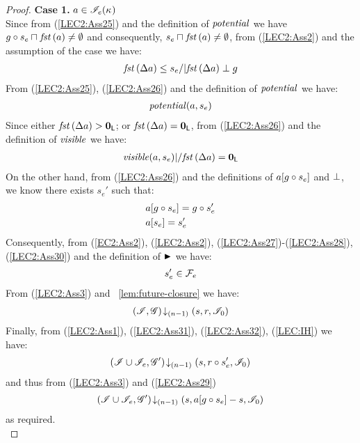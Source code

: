\begin{lemma}
\begin{proof}
\noindent\textbf{Case 1. }$a \in \mathscr{I}_e(\kappa_{})$\\
Since from (\ref{LEC2:Ass25}) and the definition of $\mathit{potential}$ we have $g \circ s_e \sqcap_{} \mathit{fst}\left(a\right) \not= \emptyset$ and consequently, $s_e \sqcap_{} \mathit{fst}\left(a\right) \not= \emptyset$, from (\ref{LEC2:Ass2}) and the assumption of the case we have:
%
\begin{align}
	\mathit{fst}\left(\Delta {a}\right) \leq s_e /| \mathit{fst}\left(\Delta {a}\right) \mathrel{\bot} g \label{LEC2:Ass26}
\end{align}
% 
From (\ref{LEC2:Ass25}), (\ref{LEC2:Ass26}) and the definition of $\mathit{potential}$ we have:
%
\begin{align}
	\mathit{potential}(a, s_e) \label{LEC2:Ass27}
\end{align}
%
Since either $\mathit{fst}\left(\Delta {a}\right) > \mathbf{0}_{\textsf{L}}$; or $\mathit{fst}\left(\Delta {a}\right) = \mathbf{0}_{\textsf{L}}$, from (\ref{LEC2:Ass26}) and the definition of $\mathit{visible}$ we have:
%
\begin{align}
	\mathit{visible}(a, s_e) |/ \mathit{fst}\left(\Delta {a}\right) = \mathbf{0}_{\textsf{L}} \label{LEC2:Ass28}
\end{align}
%
On the other hand, from (\ref{LEC2:Ass26}) and the definitions of $a[g \circ s_e]$ and $\mathrel{\bot}$, we know there exists $s_e'$ such that: 
%
\begin{align}
	& a[g \circ s_e] = g \circ s_e' \label{LEC2:Ass29}\\
	& a[s_e] = s_e'  \label{LEC2:Ass30}
\end{align}
%
Consequently, from (\ref{EC2:Ass2}), (\ref{LEC2:Ass2}), (\ref{LEC2:Ass27})-(\ref{LEC2:Ass28}), (\ref{LEC2:Ass30}) and the definition of $\strictfences$ we have:
%
\begin{align}
	s_e' \in \mathcal{F}_{e}  \label{LEC2:Ass31}
\end{align}
%
From (\ref{LEC2:Ass3}) and \lem~\ref{lem:future-closure} we have:
%
\begin{align}
	\left(\mathscr{I}, \mathscr{G}\right) \!\downarrow_{(n-1)} \left(s, r, \mathscr{I}_0\right)  \label{LEC2:Ass32}
\end{align}
%
Finally, from (\ref{LEC2:Ass1}), (\ref{LEC2:Ass31}), (\ref{LEC2:Ass32}), (\ref{LEC:IH}) we have:
%
\begin{align*}
	\left(\mathscr{I} \cup \mathscr{I}_{e}, \mathscr{G}'\right) \!\downarrow_{(n-1)} \left(s, r \circ s_e', \mathscr{I}_0\right)
\end{align*}
%
and thus from (\ref{LEC2:Ass3}) and (\ref{LEC2:Ass29}) 
%
\begin{align*}
	\left(\mathscr{I} \cup \mathscr{I}_{e}, \mathscr{G}'\right) \!\downarrow_{(n-1)} \left(s, a[g \circ s_e] - s, \mathscr{I}_0\right)
\end{align*}
%
as required.\\


\end{proof}
\end{lemma}
